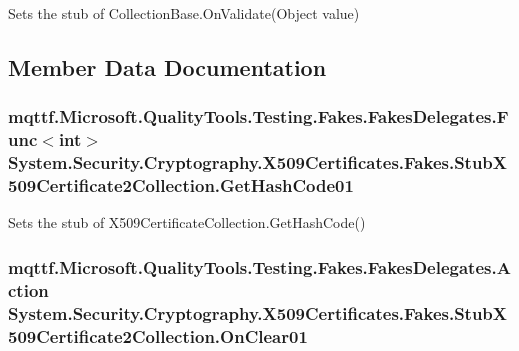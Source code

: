 Sets the stub of Collection\-Base.\-On\-Validate(\-Object value)



\subsection{Member Data Documentation}
\hypertarget{class_system_1_1_security_1_1_cryptography_1_1_x509_certificates_1_1_fakes_1_1_stub_x509_certificate2_collection_acbc185a40a453e173ff8c0897171d803}{
\subsubsection[{Get\-Hash\-Code01}]{\setlength{\rightskip}{0pt plus 5cm}mqttf.\-Microsoft.\-Quality\-Tools.\-Testing.\-Fakes.\-Fakes\-Delegates.\-Func$<$int$>$ System.\-Security.\-Cryptography.\-X509\-Certificates.\-Fakes.\-Stub\-X509\-Certificate2\-Collection.\-Get\-Hash\-Code01}}\label{class_system_1_1_security_1_1_cryptography_1_1_x509_certificates_1_1_fakes_1_1_stub_x509_certificate2_collection_acbc185a40a453e173ff8c0897171d803}


Sets the stub of X509\-Certificate\-Collection.\-Get\-Hash\-Code()

\hypertarget{class_system_1_1_security_1_1_cryptography_1_1_x509_certificates_1_1_fakes_1_1_stub_x509_certificate2_collection_a59b6422e9c7d3c6ba27f8092aaad2310}{
\subsubsection[{On\-Clear01}]{\setlength{\rightskip}{0pt plus 5cm}mqttf.\-Microsoft.\-Quality\-Tools.\-Testing.\-Fakes.\-Fakes\-Delegates.\-Action System.\-Security.\-Cryptography.\-X509\-Certificates.\-Fakes.\-Stub\-X509\-Certificate2\-Collection.\-On\-Clear01}}\label{class_system_1_1_security_1_1_cryptography_1_1_x509_certificates_1_1_fakes_1_1_stub_x509_certificate2_collection_a59b6422e9c7d3c6ba27f8092aaad2310}


